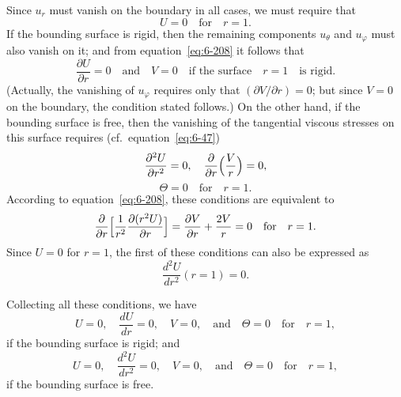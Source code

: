 Since $u_r$ must vanish on the boundary in all cases, we must require that
\begin{equation}\label{eq:6-235}
U = 0 \quad\text{for}\quad r = 1.
\end{equation}
If the bounding surface is rigid, then the remaining components $u_\theta$ and $u_\varphi$
must also vanish on it; and from equation~\eqref{eq:6-208} it follows that
\begin{equation}\label{eq:6-236}
\frac{\partial U}{\partial r} = 0\quad\text{and}\quad V = 0\quad\text{if the surface}\quad r = 1\quad\text{is rigid.}
\end{equation}
(Actually, the vanishing of $u_\varphi$ requires only that $(\partial V/\partial r) = 0$; but
since $V = 0$ on the boundary, the condition stated follows.) On the
other hand, if the bounding surface is free, then the vanishing of the
tangential viscous stresses on this surface requires (cf.\ equation~\eqref{eq:6-47})
\begin{equation}\label{eq:6-237}
\frac{\partial^2 U}{\partial r^2} = 0,\quad\frac{\partial}{\partial r}\Bigl(\frac{V}{r}\Bigr) = 0,
\end{equation}
\begin{equation}\label{eq:6-238}
\Theta = 0 \quad\text{for}\quad r = 1.
\end{equation}
According to equation~\eqref{eq:6-208}, these conditions are equivalent to
\begin{equation}\label{eq:6-239}
\frac{\partial}{\partial r}\Bigl[\frac{1}{r^2}\frac{\partial(r^2 U)}{\partial r}\Bigr] = \frac{\partial V}{\partial r} + \frac{2V}{r} = 0 \quad\text{for}\quad r = 1.
\end{equation}
Since $U = 0$ for $r = 1$, the first of these conditions can also be expressed
as
\begin{equation}\label{eq:6-240}
\frac{d^2 U}{dr^2}(r=1) = 0.
\end{equation}

Collecting all these conditions, we have
\begin{equation}\label{eq:6-241}
U = 0,\quad \frac{dU}{dr} = 0,\quad V = 0,\quad\text{and}\quad \Theta = 0\quad\text{for}\quad r = 1,
\end{equation}
if the bounding surface is rigid; and
\begin{equation}\label{eq:6-242}
U = 0,\quad \frac{d^2 U}{dr^2} = 0,\quad V = 0, \quad\text{and}\quad \Theta = 0\quad\text{for}\quad r = 1,
\end{equation}
if the bounding surface is free.

